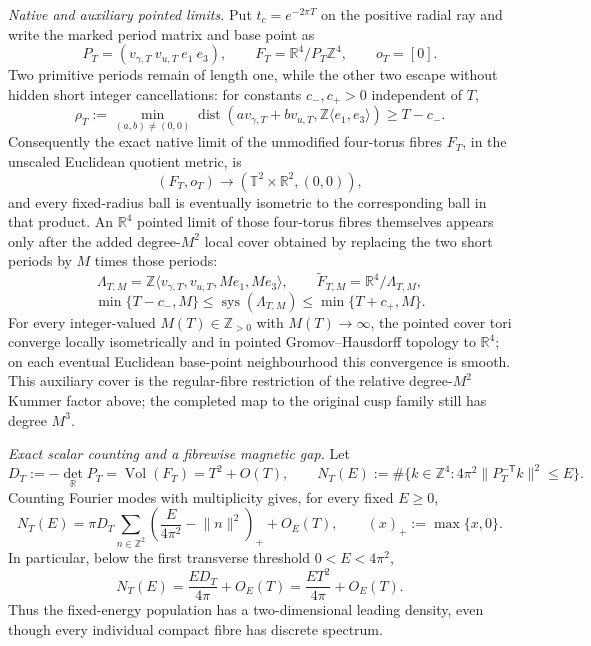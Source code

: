 \documentclass[10pt,letterpaper]{article}
\begin{document}
\medskip\noindent
\textit{Native and auxiliary pointed limits.}
Put $t_c=e^{-2\pi T}$ on the positive radial ray and write the marked period
matrix and base point as
\[
 P_T=(v_{\gamma,T}\ v_{u,T}\ e_1\ e_3),\qquad
 F_T=\mathbb R^4/P_T\mathbb Z^4,\qquad o_T=[0].
\]
Two primitive periods remain of length one, while the other two escape
without hidden short integer cancellations: for constants
$c_-,c_+>0$ independent of $T$,
\[
 \rho_T:=\min_{(a,b)\ne(0,0)}
 \operatorname{dist}\!\left(
 av_{\gamma,T}+bv_{u,T},
 \mathbb Z\langle e_1,e_3\rangle\right)
 \ge T-c_-.
\]
Consequently the exact native limit of the unmodified four-torus fibres
\(F_T\), in the unscaled Euclidean quotient metric, is
\[
 (F_T,o_T)\longrightarrow
 (\mathbb T^2\times\mathbb R^2,(0,0)),
\]
and every fixed-radius ball is eventually isometric to the corresponding
ball in that product.  An $\mathbb R^4$ pointed limit of those four-torus
fibres themselves appears only after the added degree-$M^2$ local cover
obtained by replacing the two short periods by $M$ times those periods:
\[
 \Lambda_{T,M}=
 \mathbb Z\langle v_{\gamma,T},v_{u,T},Me_1,Me_3\rangle,
 \qquad
 \widetilde F_{T,M}=\mathbb R^4/\Lambda_{T,M},
\]
\[
 \min\{T-c_-,M\}\leq\operatorname{sys}(\Lambda_{T,M})
 \leq\min\{T+c_+,M\}.
\]
For every integer-valued $M(T)\in\mathbb Z_{>0}$ with
$M(T)\to\infty$, the pointed cover tori converge locally isometrically and
in pointed Gromov--Hausdorff topology to $\mathbb R^4$; on each eventual
Euclidean base-point neighbourhood this convergence is smooth.  This
auxiliary cover is the regular-fibre restriction of the relative
degree-$M^2$ Kummer factor above; the completed map to the original cusp
family still has degree $M^3$.

\medskip\noindent
\textit{Exact scalar counting and a fibrewise magnetic gap.}
Let
\[
 D_T:=-\det_{\mathbb R}P_T
 =\operatorname{Vol}(F_T)=T^2+O(T),
 \qquad
 N_T(E):=\#\{k\in\mathbb Z^4:
 4\pi^2\lVert P_T^{-\mathsf T}k\rVert^2\le E\}.
\]
Counting Fourier modes with multiplicity gives, for every fixed $E\ge0$,
\[
 N_T(E)=\pi D_T\sum_{n\in\mathbb Z^2}
 \left(\frac{E}{4\pi^2}-\lVert n\rVert^2\right)_++O_E(T),
 \qquad (x)_+:=\max\{x,0\}.
\]
In particular, below the first transverse threshold $0<E<4\pi^2$,
\[
 N_T(E)=\frac{ED_T}{4\pi}+O_E(T)
 =\frac{ET^2}{4\pi}+O_E(T).
\]
Thus the fixed-energy population has a two-dimensional leading density,
even though every individual compact fibre has discrete spectrum.
\end{document}
